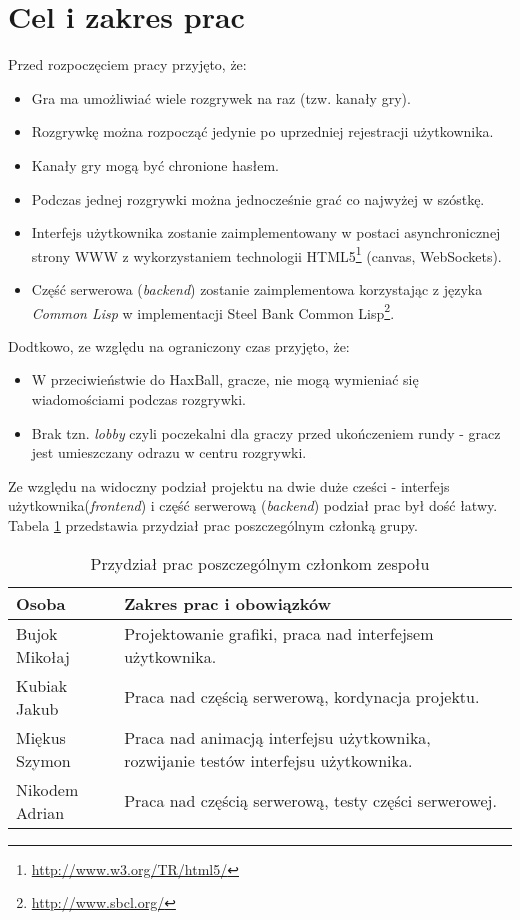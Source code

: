 \section{Cel i zakres prac}
Przed rozpoczęciem pracy przyjęto, że:
\begin{itemize}
\itemsep0em
  \item Gra ma umożliwiać wiele rozgrywek na raz (tzw. kanały gry).
  \item Rozgrywkę można rozpocząć jedynie po uprzedniej rejestracji użytkownika.
  \item Kanały gry mogą być chronione hasłem.
  \item Podczas jednej rozgrywki można jednocześnie grać co najwyżej w szóstkę.
  \item Interfejs użytkownika zostanie zaimplementowany w postaci asynchronicznej strony WWW z wykorzystaniem technologii HTML5\footnote{\url{http://www.w3.org/TR/html5/}} (canvas, WebSockets).
  \item Część serwerowa (\emph{backend}) zostanie zaimplementowa korzystając z języka \emph{Common Lisp} w implementacji Steel Bank Common Lisp\footnote{\url{http://www.sbcl.org/}}.
\end{itemize}

Dodtkowo, ze względu na ograniczony czas przyjęto, że:
\begin{itemize}
  \item W przeciwieństwie do HaxBall, gracze, nie mogą wymieniać się wiadomościami podczas rozgrywki.
  \item Brak tzn. \emph{lobby} czyli poczekalni dla graczy przed ukończeniem rundy - gracz jest umieszczany odrazu w centru rozgrywki.
\end{itemize}

Ze względu na widoczny podział projektu na dwie duże cześci - interfejs użytkownika(\emph{frontend}) i część serwerową (\emph{backend}) podział prac był dość łatwy. Tabela \ref{tab:podzia} przedstawia przydział prac poszczególnym członką grupy.

\begin{table}[h]
  \centering
  \begin{tabular}{ |l|p{8cm}| }
    \hline
    Osoba & Zakres prac i obowiązków \\ \hline
    Bujok Mikołaj &

    Projektowanie grafiki, praca nad interfejsem użytkownika.\\
    Kubiak Jakub & Praca nad częścią serwerową,  kordynacja projektu.\\
    Miękus Szymon & Praca nad animacją interfejsu użytkownika, rozwijanie testów interfejsu użytkownika. \\
    Nikodem Adrian &  Praca nad częścią serwerową, testy części serwerowej.\\
    \hline
  \end{tabular}
  \caption{Przydział prac poszczególnym członkom zespołu}
  \label{tab:podzia}
\end{table}
